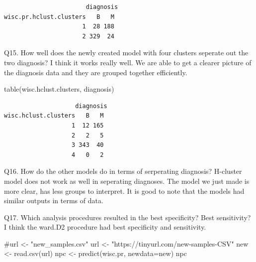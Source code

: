 \documentclass[
  letterpaper,
  DIV=11,
  numbers=noendperiod]{scrartcl}
\newenvironment{Shaded}{\begin{snugshade}}{\end{snugshade}}
\newcommand{\AttributeTok}[1]{\textcolor[rgb]{0.40,0.45,0.13}{#1}}
\newcommand{\CommentTok}[1]{\textcolor[rgb]{0.37,0.37,0.37}{#1}}
\newcommand{\FunctionTok}[1]{\textcolor[rgb]{0.28,0.35,0.67}{#1}}
\newcommand{\NormalTok}[1]{\textcolor[rgb]{0.00,0.23,0.31}{#1}}
\newcommand{\OtherTok}[1]{\textcolor[rgb]{0.00,0.23,0.31}{#1}}
\newcommand{\StringTok}[1]{\textcolor[rgb]{0.13,0.47,0.30}{#1}}
\begin{document}
\begin{verbatim}
                       diagnosis
wisc.pr.hclust.clusters   B   M
                      1  28 188
                      2 329  24
\end{verbatim}

Q15. How well does the newly created model with four clusters seperate
out the two diagnosis? I think it works really well. We are able to get
a clearer picture of the diagnosis data and they are grouped together
efficiently.

\begin{Shaded}
\begin{Highlighting}[]
\FunctionTok{table}\NormalTok{(wisc.hclust.clusters, diagnosis)}
\end{Highlighting}
\end{Shaded}

\begin{verbatim}
                    diagnosis
wisc.hclust.clusters   B   M
                   1  12 165
                   2   2   5
                   3 343  40
                   4   0   2
\end{verbatim}

Q16. How do the other models do in terms of serperating diagnosis?
H-cluster model does not work as well in seperating diagnoses. The model
we just made is more clear, has less groups to interpret. It is good to
note that the models had similar outputs in terms of data.

Q17. Which analysis procedures resulted in the best specificity? Best
sensitivity? I think the ward.D2 procedure had best specificity and
sensitivity.

\begin{Shaded}
\begin{Highlighting}[]
\CommentTok{\#url \textless{}{-} "new\_samples.csv"}
\NormalTok{url }\OtherTok{\textless{}{-}} \StringTok{"https://tinyurl.com/new{-}samples{-}CSV"}
\NormalTok{new }\OtherTok{\textless{}{-}} \FunctionTok{read.csv}\NormalTok{(url)}
\NormalTok{npc }\OtherTok{\textless{}{-}} \FunctionTok{predict}\NormalTok{(wisc.pr, }\AttributeTok{newdata=}\NormalTok{new)}
\NormalTok{npc}
\end{Highlighting}
\end{Shaded}
\end{document}
